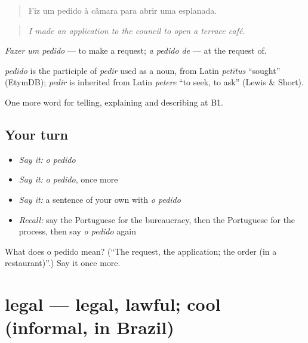 \begin{quote}
Fiz um pedido à câmara para abrir uma esplanada.
\end{quote}

\begin{quote}
\emph{I made an application to the council to open a terrace café.}
\end{quote}

\emph{Fazer um pedido} — to make a request; \emph{a pedido de} — at the request of.

\begin{cousinweb}
\emph{pedido} is the participle of \emph{pedir} used as a noun, from Latin \emph{petītus} \textquotedblleft{}sought\textquotedblright{} (EtymDB); \emph{pedir} is inherited from Latin \emph{petere} \textquotedblleft{}to seek, to ask\textquotedblright{} (Lewis \& Short).
\end{cousinweb}

\begin{grammarlens}[title={What you've built}]
One more word for telling, explaining and describing at B1.
\end{grammarlens}

\subsection*{Your turn}
\begin{itemize}
\raggedright
  \item \emph{Say it:} \emph{o pedido}
  \item \emph{Say it:} \emph{o pedido}, once more
  \item \emph{Say it:} a sentence of your own with \emph{o pedido}
  \item \emph{Recall:} say the Portuguese for the bureaucracy, then the Portuguese for the process, then say \emph{o pedido} again
\end{itemize}

\begin{tcolorbox}[breakable,colback=teal!4,colframe=teal!35!black,title={Before you move on}]
What does o pedido mean? (\textquotedblleft{}The request, the application; the order (in a restaurant)\textquotedblright{}.) Say it once more.
\end{tcolorbox}
\section[legal]{legal — legal, lawful; cool (informal, in Brazil)}

